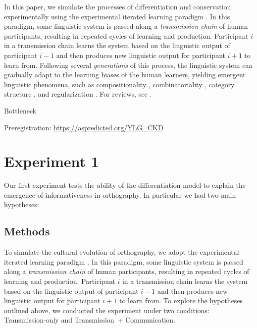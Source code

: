 \documentclass[doc,biblatex]{apa7}
\begin{document}
In this paper, we simulate the processes of differentiation and conservation experimentally using the experimental iterated learning paradigm \parencite{Kirby:2008}. In this paradigm, some linguistic system is passed along a \textit{transmission chain} of human participants, resulting in repeated cycles of learning and production. Participant $i$ in a transmission chain learns the system based on the linguistic output of participant $i-1$ and then produces new linguistic output for participant $i+1$ to learn from. Following several \textit{generations} of this process, the linguistic system can gradually adapt to the learning biases of the human learners, yielding emergent linguistic phenomena, such as compositionality \parencite{Kirby:2008, Kirby:2015, Beckner:2017}, combinatoriality \parencite{Verhoef:2015}, category structure \parencite{Carr:2017, Canini:2014, Silvey:2019}, and regularization \parencite{Smith:2010, Ferdinand:2019}. For reviews, see \textcite{Tamariz:2017, Kirby:2014, ScottPhillips:2010}.

Bottleneck

Preregistration: \url{https://aspredicted.org/YLG_CKD}


\section{Experiment 1}

Our first experiment tests the ability of the differentiation model to explain the emergence of informativeness in orthography. In particular we had two main hypotheses:

\subsection{Methods}

To simulate the cultural evolution of orthography, we adopt the experimental iterated learning paradigm \parencite{Kirby:2008, Kirby:2015}. In this paradigm, some linguistic system is passed along a \textit{transmission chain} of human participants, resulting in repeated cycles of learning and production. Participant $i$ in a transmission chain learns the system based on the linguistic output of participant $i-1$ and then produces new linguistic output for participant $i+1$ to learn from. To explore the hypotheses outlined above, we conducted the experiment under two conditions: Transmission-only and Transmission~+ Communication.
\end{document}
